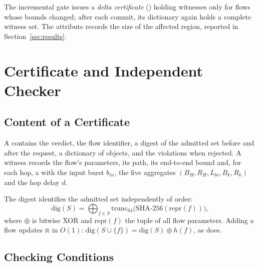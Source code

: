 \documentclass[9pt,a4paper,twocolumn,twoside]{tau-class/tau}
\providecommand{\secref}[1]{Section~\ref{#1}}
\begin{document}
        The incremental gate issues a \emph{delta certificate} () holding witnesses only for flows whose bounds changed; after each commit, its  dictionary again holds a complete witness set. The attribute  records the size of the affected region, reported in \secref{sec:results}.


\section{Certificate and Independent Checker}

    \subsection{Content of a Certificate}

        A  contains the verdict, the flow identifier, a digest of the admitted set before and after the request, a dictionary of  objects, and the violations when rejected. A witness records the flow's parameters, its path, its end-to-end bound and, for each hop, a  with the input burst $b_{in}$, the five aggregates $(B_H, R_H, L_{lo}, B_k, R_k)$ and the hop delay $d$.

        The digest identifies the admitted set independently of order:
        \begin{equation}\label{eq:digest}
            \mathrm{dig}(S) = \bigoplus_{f \in S} \mathrm{trunc}_{64}\big(\mbox{SHA-256}(\mathrm{repr}(f))\big),
        \end{equation}
        where $\oplus$ is bitwise XOR and $\mathrm{repr}(f)$ the tuple of all flow parameters. Adding a flow updates it in $O(1)$: $\mathrm{dig}(S \cup \{f\}) = \mathrm{dig}(S) \oplus h(f)$, as  does.

    \subsection{Checking Conditions}
\end{document}
